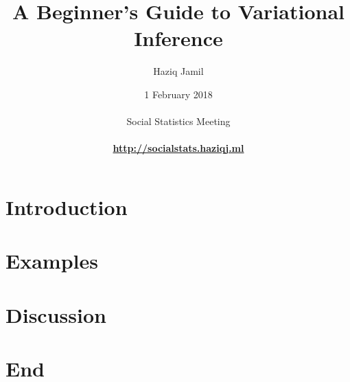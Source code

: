 \documentclass[]{beamer}
\begin{document}

\title[Variational inference]{A Beginner's Guide to Variational Inference}
\author[Haziq Jamil]{
  \large{Haziq Jamil}\\ 
}
\date[1 Feb 2018]{
  1 February 2018\\
  \hspace{1cm}\\
  Social Statistics Meeting\\
  \hspace{1cm}\\
  \href{http://socialstats.haziqj.ml}{\color{fu-red!60} \textbf{http://socialstats.haziqj.ml}}
}

\mytitle


\mytoc


\section{Introduction}


\section[Examples]{Examples}
\transition


\section{Discussion}
\transition


\section*{End}
\thankyou
\end{document}
